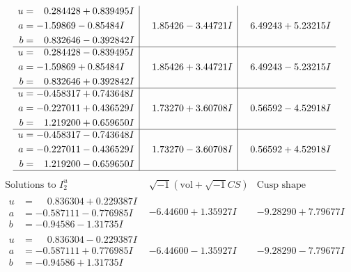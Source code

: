 \documentclass[1p]{elsarticle_modified}
\theoremstyle{definition}
\newcommand{\I}{\sqrt{-1}}
\begin{document}
$$\begin{array}{c|c|c}
\begin{aligned}
u &= \phantom{-}0.284428 + 0.839495 I \\
a &= -1.59869 - 0.85484 I \\
b &= \phantom{-}0.832646 - 0.392842 I\end{aligned}
 & \phantom{-}1.85426 - 3.44721 I & \phantom{-}6.49243 + 5.23215 I \\ \hline\begin{aligned}
u &= \phantom{-}0.284428 - 0.839495 I \\
a &= -1.59869 + 0.85484 I \\
b &= \phantom{-}0.832646 + 0.392842 I\end{aligned}
 & \phantom{-}1.85426 + 3.44721 I & \phantom{-}6.49243 - 5.23215 I \\ \hline\begin{aligned}
u &= -0.458317 + 0.743648 I \\
a &= -0.227011 + 0.436529 I \\
b &= \phantom{-}1.219200 + 0.659650 I\end{aligned}
 & \phantom{-}1.73270 + 3.60708 I & \phantom{-}0.56592 - 4.52918 I \\ \hline\begin{aligned}
u &= -0.458317 - 0.743648 I \\
a &= -0.227011 - 0.436529 I \\
b &= \phantom{-}1.219200 - 0.659650 I\end{aligned}
 & \phantom{-}1.73270 - 3.60708 I & \phantom{-}0.56592 + 4.52918 I\\
 \hline 
 \end{array}$$\newpage$$\begin{array}{c|c|c}  
\text{Solutions to }I^u_{2}& \I (\text{vol} + \sqrt{-1}CS) & \text{Cusp shape}\\
 \hline 
\begin{aligned}
u &= \phantom{-}0.836304 + 0.229387 I \\
a &= -0.587111 - 0.776985 I \\
b &= -0.94586 - 1.31735 I\end{aligned}
 & -6.44600 + 1.35927 I & -9.28290 + 7.79677 I \\ \hline\begin{aligned}
u &= \phantom{-}0.836304 - 0.229387 I \\
a &= -0.587111 + 0.776985 I \\
b &= -0.94586 + 1.31735 I\end{aligned}
 & -6.44600 - 1.35927 I & -9.28290 - 7.79677 I \\ \hline\begin{aligned}

\end{aligned}
\end{array}$$
\end{document}
